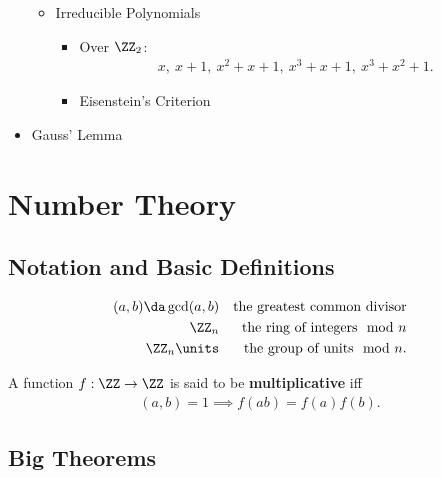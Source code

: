 \begin{itemize}
  \begin{itemize}
  \tightlist
  \item
    Irreducible Polynomials

    \begin{itemize}
    \tightlist
    \item
      Over \(\ZZ_2\):~
      \begin{align*}  
      x,~ x+1,~ x^2+x+1,~ x^3+x+1,~ x^3+x^2+1 
      .\end{align*}
    \item
      Eisenstein's Criterion
    \end{itemize}
  \end{itemize}
\item
  Gauss' Lemma
\end{itemize}


\hypertarget{number-theory}{%
\section{Number Theory}\label{number-theory}}

\hypertarget{notation-and-basic-definitions}{%
\subsection{Notation and Basic
Definitions}\label{notation-and-basic-definitions}}

\begin{align*}  
(a, b) \da \gcd(a, b) && \text{the greatest common divisor} \\
\ZZ_n && \text{the ring of integers} \mod n \\
\ZZ_n\units && \text{the group of units}\mod n
.\end{align*}

\begin{definition}

A function \(f:\ZZ \to \ZZ\) is said to be \textbf{multiplicative} iff
\begin{align*}  
(a, b) = 1 \implies f(ab) = f(a) f(b)
.\end{align*}

\end{definition}

\hypertarget{big-theorems-3}{%
\subsection{Big Theorems}\label{big-theorems-3}}

